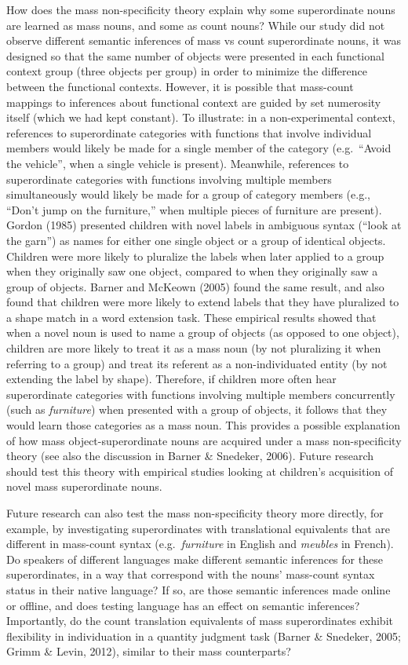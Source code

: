 \documentclass[
  man,floatsintext]{apa6}
\begin{document}
How does the mass non-specificity theory explain why some superordinate nouns are learned as mass nouns, and some as count nouns? While our study did not observe different semantic inferences of mass vs count superordinate nouns, it was designed so that the same number of objects were presented in each functional context group (three objects per group) in order to minimize the difference between the functional contexts. However, it is possible that mass-count mappings to inferences about functional context are guided by set numerosity itself (which we had kept constant). To illustrate: in a non-experimental context, references to superordinate categories with functions that involve individual members would likely be made for a single member of the category (e.g.~``Avoid the vehicle'', when a single vehicle is present). Meanwhile, references to superordinate categories with functions involving multiple members simultaneously would likely be made for a group of category members (e.g., ``Don't jump on the furniture,'' when multiple pieces of furniture are present). Gordon (1985) presented children with novel labels in ambiguous syntax (``look at the garn'') as names for either one single object or a group of identical objects. Children were more likely to pluralize the labels when later applied to a group when they originally saw one object, compared to when they originally saw a group of objects. Barner and McKeown (2005) found the same result, and also found that children were more likely to extend labels that they have pluralized to a shape match in a word extension task. These empirical results showed that when a novel noun is used to name a group of objects (as opposed to one object), children are more likely to treat it as a mass noun (by not pluralizing it when referring to a group) and treat its referent as a non-individuated entity (by not extending the label by shape). Therefore, if children more often hear superordinate categories with functions involving multiple members concurrently (such as \emph{furniture}) when presented with a group of objects, it follows that they would learn those categories as a mass noun. This provides a possible explanation of how mass object-superordinate nouns are acquired under a mass non-specificity theory (see also the discussion in Barner \& Snedeker, 2006). Future research should test this theory with empirical studies looking at children's acquisition of novel mass superordinate nouns.

Future research can also test the mass non-specificity theory more directly, for example, by investigating superordinates with translational equivalents that are different in mass-count syntax (e.g.~\emph{furniture} in English and \emph{meubles} in French). Do speakers of different languages make different semantic inferences for these superordinates, in a way that correspond with the nouns' mass-count syntax status in their native language? If so, are those semantic inferences made online or offline, and does testing language has an effect on semantic inferences? Importantly, do the count translation equivalents of mass superordinates exhibit flexibility in individuation in a quantity judgment task (Barner \& Snedeker, 2005; Grimm \& Levin, 2012), similar to their mass counterparts?
\end{document}
